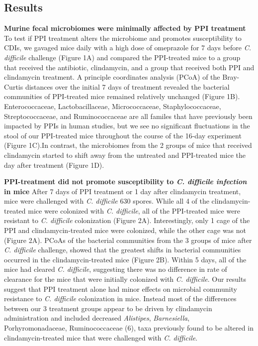 \documentclass[11pt,]{article}
\begin{document}
\subsection{Results}\label{results}

\textbf{Murine fecal microbiomes were minimally affected by PPI
treatment } To test if PPI treatment alters the microbiome and promotes
susceptibility to CDIs, we gavaged mice daily with a high dose of
omeprazole for 7 days before \emph{C. difficile} challenge (Figure 1A)
and compared the PPI-treated mice to a group that received the
antibiotic, clindamycin, and a group that received both PPI and
clindamycin treatment. A principle coordinates analysis (PCoA) of the
Bray-Curtis distances over the initial 7 days of treatment revealed the
bacterial communities of PPI-treated mice remained relatively unchanged
(Figure 1B). Enterococcaceae, Lactobacillaceae, Micrococcaceae,
Staphylococcaceae, Streptococcaceae, and Ruminococcaceae are all familes
that have previously been impacted by PPIs in human studies, but we see
no significant fluctuations in the stool of our PPI-treated mice
throughout the course of the 16-day experiment (Figure 1C).In contrast,
the microbiomes from the 2 groups of mice that received clindamycin
started to shift away from the untreated and PPI-treated mice the day
after treatment (Figure 1D).

\textbf{PPI-treatment did not promote susceptibility to \emph{C.
difficile infection} in mice} After 7 days of PPI treatment or 1 day
after clindamycin treatment, mice were challenged with \emph{C.
difficile} 630 spores. While all 4 of the clindamycin-treated mice were
colonized with \emph{C. difficile}, all of the PPI-treated mice were
resistant to \emph{C. difficile} colonization (Figure 2A).
Interestingly, only 1 cage of the PPI and clindamycin-treated mice were
colonized, while the other cage was not (Figure 2A). PCoAs of the
bacterial communities from the 3 groups of mice after \emph{C.
difficile} challenge, showed that the greatest shifts in bacterial
communities occurred in the clindamycin-treated mice (Figure 2B). Within
5 days, all of the mice had cleared \emph{C. difficile}, suggesting
there was no difference in rate of clearance for the mice that were
initially colonized with \emph{C. difficile}. Our results suggest that
PPI treatment alone had minor effects on microbial community resistance
to \emph{C. difficile} colonization in mice. Instead most of the
differences between our 3 treatment groups appear to be driven by
clindamycin administration and included decreased \emph{Alistipes},
\emph{Barnesiella}, Porhyromonadaceae, Ruminococcaceae (6), taxa
previously found to be altered in clindamycin-treated mice that were
challenged with \emph{C. difficile}.
\end{document}
